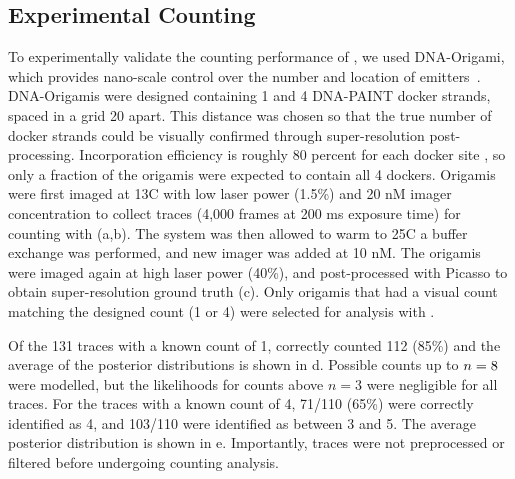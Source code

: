 \subsection{Experimental Counting}
To experimentally validate the counting performance of \ours, we used DNA-Origami, 
which provides nano-scale control over the number and location of emitters~\citep{rothemund_folding_2006}.
	DNA-Origamis were designed containing 1 and 4 DNA-PAINT docker strands, 
	spaced in a grid 20 \nanometer apart. 
	This distance was chosen so that the true number of docker strands 
	could be visually confirmed through super-resolution post-processing.
	Incorporation efficiency is roughly 80 percent for each docker site \cite{strauss_2018}, 
	so only a fraction of the origamis were expected to contain all 4 dockers. 
	Origamis were first imaged at 13\textdegree C with low laser power (1.5\%) and 20 nM imager concentration to 
	collect traces (4,000 frames at 200 ms exposure time) for counting with \ours (a,b).
	The system was then allowed to warm to 25\textdegree C a buffer exchange was performed, and new imager 
	was added at 10 nM.
	The origamis were imaged again at high laser power (40\%),
	and post-processed with Picasso \citep{schnitzbauer_2017} to obtain super-resolution ground truth (c).
	Only origamis that had a visual count matching the designed count (1 or 4) were selected for analysis with \ours.

Of the 131 traces with a known count of 1, \ours correctly counted 112 (85\%)
and the average of the posterior distributions is shown in d.
	Possible counts up to $n=8$ were modelled, but the likelihoods for counts above $n=3$ were negligible for all traces.
	For the traces with a known count of 4, 71/110 (65\%) were correctly identified as 4, 
	and 103/110 were identified as between 3 and 5. 
	The average posterior distribution is shown in e.
	Importantly, traces were not preprocessed or filtered before undergoing \ours counting analysis.
